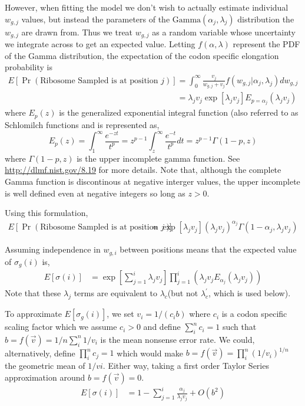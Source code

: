 \documentclass{article}
\newcommand{\elongWaitTime}{\ensuremath{w}\xspace}
\newcommand{\wgi}{\ensuremath{\elongWaitTime_{g,i}}\xspace}
\newcommand{\wgj}{\ensuremath{\elongWaitTime_{g,j}}\xspace}
\newcommand{\alphaj}{\ensuremath{{\alpha_j}}\xspace}
\newcommand{\lambdac}{\ensuremath{{\lambda_c}}\xspace}
\newcommand{\lambdacprime}{\ensuremath{{\lambda_c^\prime}}\xspace}
\newcommand{\lambdaj}{\ensuremath{{\lambda_j}}\xspace}
\newcommand{\nseWaitTime}{\ensuremath{v}\xspace}
\newcommand{\vi}{\ensuremath{\nseWaitTime_{i}}\xspace}
\newcommand{\vj}{\ensuremath{\nseWaitTime_{j}}\xspace}
\newcommand{\sigmag}{\ensuremath{\sigma_{g}}\xspace}
\newcommand{\Esigmagi}{\ensuremath{E\left[\sigma_{g}(i)\right]}\xspace}
\newcommand{\Esigmai}{\ensuremath{E\left[\sigma(i)\right]}\xspace}
\begin{document}
However, when fitting the model we don't wish to actually estimate individual \wgj values, but instead the parameters of the $\text{Gamma}\left(\alphaj, \lambdaj\right)$ distribution the \wgj are drawn from.
Thus we treat \wgj as a random variable whose uncertainty we integrate across to get an expected value.
Letting $f(\alpha, \lambda)$ represent the PDF of the Gamma distribution, the expectation of the codon specific elongation probability is
\begin{align}
\label{eq:defEElongPr}
E\left[\Pr(\text{Ribosome Sampled is at position $j$})\right] &= \int_0^\infty \frac{\vj}{\wgj + \vj} f\left(\wgj | \alphaj, \lambdaj\right) d\wgj\\
\label{eq:defEElongPrII}
 &= \lambdaj \vj \exp\left[\lambdaj \vj\right] E_{p = \alphaj}\left(\lambdaj \vj\right)
\end{align}
where $E_p(z)$ is the generalized exponential integral function (also referred to as Schlomilch functions \citep[][p.380]{OldhamEtAl2009} and is represented as,
\begin{equation}
  \label{eq:defGeneralizedExpoInt}
   E_p(z) = \int_1^\infty \frac{e^{-z t}}{t^p} = z^{p-1} \int_z^\infty \frac{e^{-t}}{t^p} dt = z^{p-1} \Gamma(1-p,z)
\end{equation}
where $\Gamma(1-p,z)$ is the upper incomplete gamma function.
See \href{http://dlmf.nist.gov/8.19}{http://dlmf.nist.gov/8.19} for more details.
Note that, although the complete Gamma function is discontinous at negative interger values, the upper incomplete is well defined even at negative integers so long as $z>0$.

Using this formulation, 
\begin{align}
\label{eq:defEElongPrIII}
E\left[\Pr(\text{Ribosome Sampled is at position $j$})\right] &= \exp\left[\lambdaj \vj\right] \left(\lambdaj \vj\right)^\alphaj  \Gamma(1-\alphaj, \lambdaj \vj)
\end{align}

Assuming independence in \wgi between positions means that the expected value of $\sigmag(i)$ is, 
\begin{align}
\label{eq:defESigma}
  \Esigmai &=  \exp\left[\sum_{j=1}^i \lambdaj \vj\right]  \prod_{j=1}^{i}\left(\lambdaj \vj  E_{\alphaj}\left(\lambdaj \vj\right) \right)
\end{align}
Note that these \lambdaj terms are equivalent to \lambdac (but not \lambdacprime, which is used below).

To approximate \Esigmagi, we set $\vi = 1/(c_i b)$ where $c_i$ is a codon specific scaling factor which we assume $c_i>0$ and define $\sum_i^n c_i = 1$ such that $b = f(\vec{v})=  1/n \sum_i^n 1/\vi$ is the mean nonsense error rate.
We could, alternatively, define $\prod_i^n c_j = 1$ which would make $b = f(\vec{v}) =  \prod_i^n (1/\vi)^{1/n}$ the geometric mean of $1/vi$.
Either way, taking a first order Taylor Series approximation around $b= f(\vec{v}) =0$.
\begin{align}
\label{eq:approxESigmag}
  \Esigmai &= 1 - \sum_{j=1}^i \frac{\alphaj}{\lambdaj \vj}+ O(b^2)
\end{align}
\end{document}
